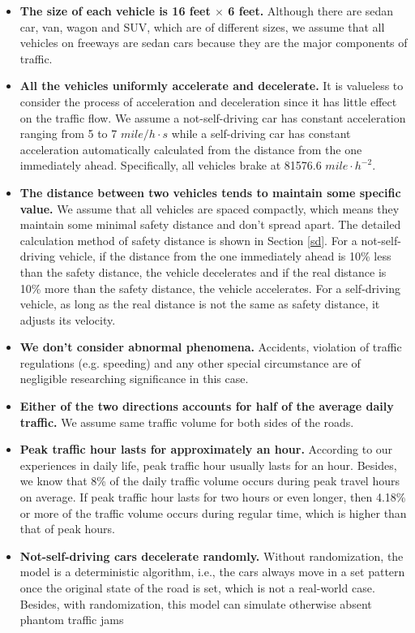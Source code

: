 \documentclass[a4paper]{article}
\begin{document}
    \begin{itemize}
\item \textbf{The size of each vehicle is 16 feet $\times$ 6 feet.} Although there are sedan car, van, wagon and SUV, which are of different sizes, we assume that all vehicles on freeways are sedan cars because they are the major components of traffic.
\item \textbf{All the vehicles uniformly accelerate and decelerate.} It is valueless to consider the process of acceleration and deceleration since it has little effect on the traffic flow. We assume a not-self-driving car has constant acceleration ranging from 5 to 7 $mile/h\cdot s$ while a self-driving car has constant acceleration automatically calculated from the distance from the one immediately ahead. Specifically, all vehicles brake at 81576.6 $mile\cdot h^{-2}$.
\item \textbf{The distance between two vehicles tends to maintain some specific value.} We assume that all vehicles are spaced compactly, which means they maintain some minimal safety distance and don’t spread apart. The detailed calculation method of safety distance is shown in Section \ref{sd}. For a not-self-driving vehicle, if the distance from the one immediately ahead is 10\% less than the safety distance, the vehicle decelerates and if the real distance is 10\% more than the safety distance, the vehicle accelerates. For a self-driving vehicle, as long as the real distance is not the same as safety distance, it adjusts its velocity.
\item \textbf{We don’t consider abnormal phenomena.} Accidents, violation of traffic regulations (e.g. speeding) and any other special circumstance are of negligible researching significance in this case.
\item \textbf{Either of the two directions accounts for half of the average daily traffic.} We assume same traffic volume for both sides of the roads.
\item \textbf{Peak traffic hour lasts for approximately an hour.}  According to our experiences in daily life, peak traffic hour usually lasts for an hour. Besides, we know that 8\% of the daily traffic volume occurs during peak travel hours on average. If peak traffic hour lasts for two hours or even longer, then 4.18\% or more of the traffic volume occurs during regular time, which is higher than that of peak hours.
\item \textbf{Not-self-driving cars decelerate randomly.} Without randomization, the model is a deterministic algorithm, i.e., the cars always move in a set pattern once the original state of the road is set, which is not a real-world case. Besides, with randomization, this model can simulate otherwise absent phantom traffic jams \footnotemark {}
\end{itemize}
\end{document}
